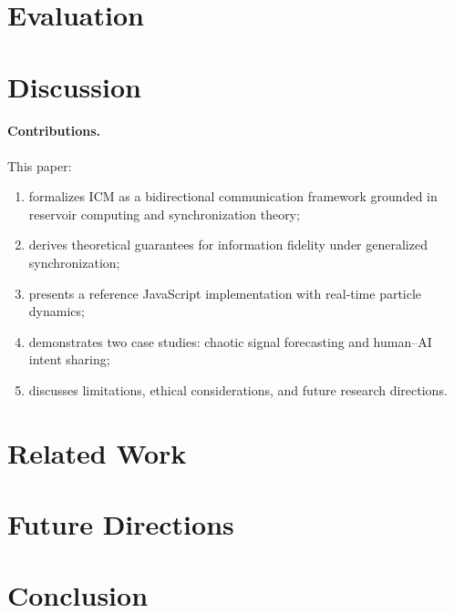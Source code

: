 \documentclass[12pt]{article}
\begin{document}
\section{Evaluation}

\section{Discussion}
\paragraph{Contributions.} This paper:
\begin{enumerate}[topsep=2pt,itemsep=2pt,parsep=0pt]
    \item formalizes ICM as a bidirectional communication framework grounded in reservoir computing and synchronization theory;
    \item derives theoretical guarantees for information fidelity under generalized synchronization;
    \item presents a reference JavaScript implementation with real‑time particle dynamics;
    \item demonstrates two case studies: chaotic signal forecasting and human–AI intent sharing;
    \item discusses limitations, ethical considerations, and future research directions.
\end{enumerate}
\section{Related Work}

\section{Future Directions}

\section{Conclusion}

\end{document}
